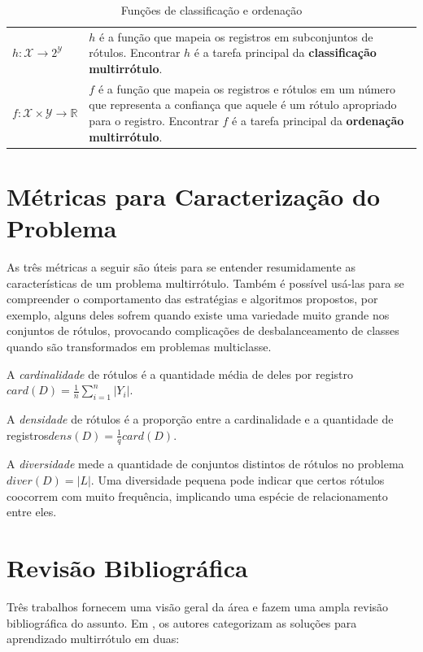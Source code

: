 \documentclass[runningheads,a4paper]{llncs}
\begin{document}
\begin{table}
	\centering
	\begin{tabular}{| >{\centering}p{4cm} | m{8cm} |}
		\hline
		\multicolumn{2}{|c|}{\textit{Funções}} \\
		\hline
		$h : \mathcal{X} \to 2^\mathcal{Y}$ & $h$ é a função que mapeia os registros em subconjuntos de rótulos. Encontrar $h$ é a tarefa principal da \textbf{classificação multirrótulo}. \\
		\hline
		$f : \mathcal{X} \times \mathcal{Y} \to \mathbb{R}$ & $f$ é a função que mapeia os registros e rótulos em um número que representa a confiança que aquele é um rótulo apropriado para o registro. Encontrar $f$ é a tarefa principal da \textbf{ordenação multirrótulo}. \\
		\hline
	\end{tabular}
	\caption{Funções de classificação e ordenação}
	\label{tab:matematica-funcoes}
\end{table}	

\section{Métricas para Caracterização do Problema} \label{sec:metricas}

As três métricas a seguir são úteis para se entender resumidamente as características de um problema multirrótulo. Também é possível usá-las para se compreender o comportamento das estratégias e algoritmos propostos, por exemplo, alguns deles sofrem quando existe uma variedade muito grande nos conjuntos de rótulos, provocando complicações de desbalanceamento de classes quando são transformados em problemas multiclasse. 

A \textit{cardinalidade} de rótulos é a quantidade média de deles por registro $card(D) = \frac{1}{n} \sum_{i = 1}^{n} |Y_i|$.

A \textit{densidade} de rótulos é a proporção entre a cardinalidade e a quantidade de registros$dens(D) = \frac{1}{q} card(D)$.

A \textit{diversidade} mede a quantidade de conjuntos distintos de rótulos no problema $diver(D) = |L|$. Uma diversidade pequena pode indicar que certos rótulos coocorrem com muito frequência, implicando uma espécie de relacionamento entre eles.

\section{Revisão Bibliográfica}\label{sec:revisao}
Três trabalhos fornecem uma visão geral da área e fazem uma ampla revisão bibliográfica do assunto. Em \cite{Tsoumakas2007-cw}, os autores categorizam as soluções para aprendizado multirrótulo em duas:
\end{document}
